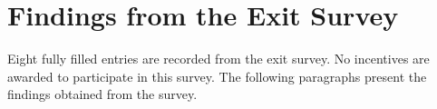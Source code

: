 %

\section{Findings from the Exit Survey}

Eight fully filled entries are recorded from the exit survey. No incentives are awarded to participate in this survey. The following paragraphs present the findings obtained from the survey.


